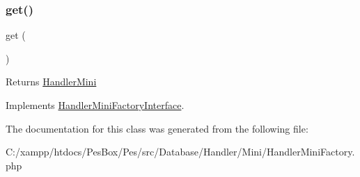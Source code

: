 \subsubsection{\texorpdfstring{get()}{get()}}
{\footnotesize\ttfamily get (\begin{DoxyParamCaption}{ }\end{DoxyParamCaption})}

\begin{DoxyReturn}{Returns}
\mbox{\hyperlink{class_pes_1_1_database_1_1_handler_1_1_mini_1_1_handler_mini}{Handler\+Mini}} 
\end{DoxyReturn}


Implements \mbox{\hyperlink{interface_pes_1_1_database_1_1_handler_1_1_mini_1_1_handler_mini_factory_interface_ac33ee765f5ad9f134540bac393721cfe}{Handler\+Mini\+Factory\+Interface}}.



The documentation for this class was generated from the following file\+:\begin{DoxyCompactItemize}
\item 
C\+:/xampp/htdocs/\+Pes\+Box/\+Pes/src/\+Database/\+Handler/\+Mini/Handler\+Mini\+Factory.\+php\end{DoxyCompactItemize}
